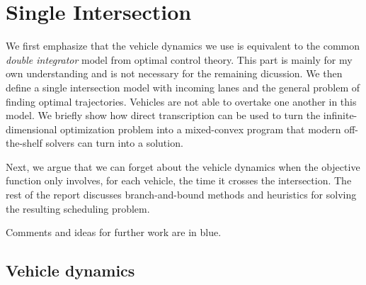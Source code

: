 \documentclass[a4paper]{article}
\author{Jeroen van Riel}
\date{\monthyeardate\today}
\title{}
\theoremstyle{definition}
\theoremstyle{plain}
\begin{document}
\section*{Single Intersection}

We first emphasize that the vehicle dynamics we use is equivalent to the common
\textit{double integrator} model from optimal control theory. This part is
mainly for my own understanding and is not necessary for the remaining
dicussion. We then define a single intersection model with incoming lanes and
the general problem of finding optimal trajectories. Vehicles are not able to
overtake one another in this model. We briefly show how direct transcription can
be used to turn the infinite-dimensional optimization problem into a
mixed-convex program that modern off-the-shelf solvers can turn into a solution.

Next, we argue that we can forget about the vehicle dynamics when the objective
function only involves, for each vehicle, the time it crosses the intersection.
The rest of the report discusses branch-and-bound methods and heuristics for
solving the resulting scheduling problem.

{\color{blue} Comments and ideas for further work are in blue.}


\subsection*{Vehicle dynamics}
\end{document}
